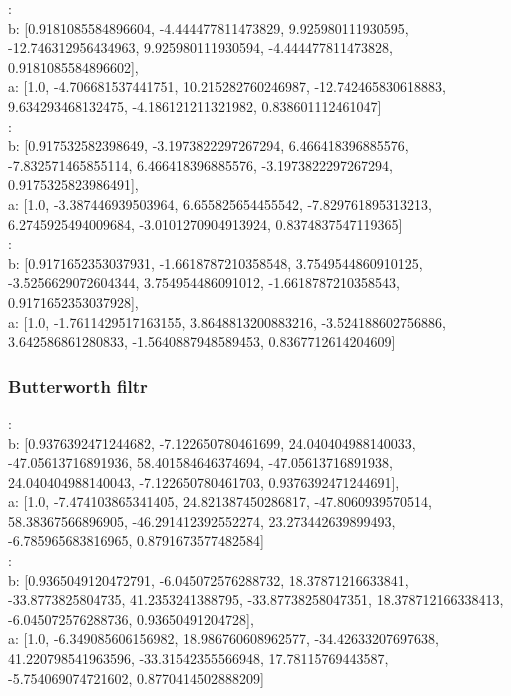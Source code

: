 :\\
b: [0.9181085584896604, -4.444477811473829, 9.925980111930595, -12.746312956434963, 9.925980111930594, -4.444477811473828, 0.9181085584896602],\\
a: [1.0, -4.706681537441751, 10.215282760246987, -12.742465830618883, 9.634293468132475, -4.186121211321982, 0.838601112461047]\\

:\\
b: [0.917532582398649, -3.1973822297267294, 6.466418396885576, -7.832571465855114, 6.466418396885576, -3.1973822297267294, 0.9175325823986491],\\
a: [1.0, -3.387446939503964, 6.655825654455542, -7.829761895313213, 6.2745925494009684, -3.0101270904913924, 0.8374837547119365]\\

:\\
b: [0.9171652353037931, -1.6618787210358548, 3.7549544860910125, -3.5256629072604344, 3.754954486091012, -1.6618787210358543, 0.9171652353037928],\\
a: [1.0, -1.7611429517163155, 3.8648813200883216, -3.524188602756886, 3.642586861280833, -1.5640887948589453, 0.8367712614204609]\\

\subsubsection{Butterworth filtr}
:\\
b: [0.9376392471244682, -7.122650780461699, 24.040404988140033, -47.05613716891936, 58.401584646374694, -47.05613716891938, 24.040404988140043, -7.122650780461703, 0.9376392471244691],\\
a: [1.0, -7.474103865341405, 24.821387450286817, -47.8060939570514, 58.38367566896905, -46.291412392552274, 23.273442639899493, -6.785965683816965, 0.8791673577482584]\\

:\\
b: [0.9365049120472791, -6.045072576288732, 18.37871216633841, -33.8773825804735, 41.2353241388795, -33.87738258047351, 18.378712166338413, -6.045072576288736, 0.93650491204728],\\
a: [1.0, -6.349085606156982, 18.986760608962577, -34.42633207697638, 41.220798541963596, -33.31542355566948, 17.78115769443587, -5.754069074721602, 0.8770414502888209]\\

